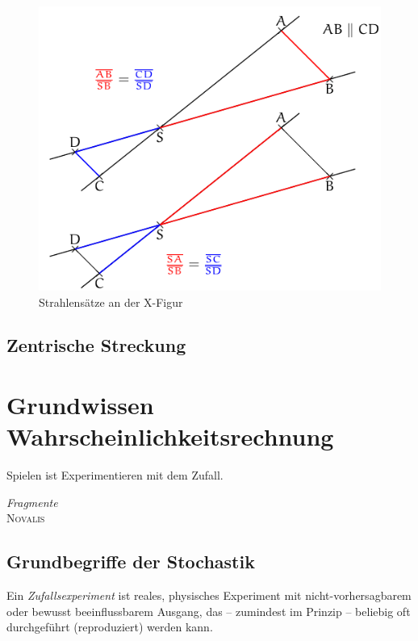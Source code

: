 \begin{regel}
 
 \begin{figure}[htp]
 \centering
 \includegraphics{./strahlensatz_x.pdf}
 \caption{Strahlensätze an der X-Figur}
 \label{fig:strahlensatz_x}
\end{figure}

 
\end{regel}


\section{Zentrische Streckung}

\chapter{Grundwissen Wahrscheinlichkeitsrechnung}

\epigraph{Spielen ist Experimentieren mit dem Zufall.}{\textit{Fragmente}\\\textsc{Novalis}}

\section{Grundbegriffe der Stochastik}

\begin{defi}[Zufallsexperiment]
 Ein \emph{Zufallsexperiment} ist reales, physisches Experiment mit nicht-vorhersagbarem oder bewusst beeinflussbarem Ausgang, das -- zumindest im Prinzip -- beliebig oft durchgeführt (reproduziert) werden kann.
\end{defi}

